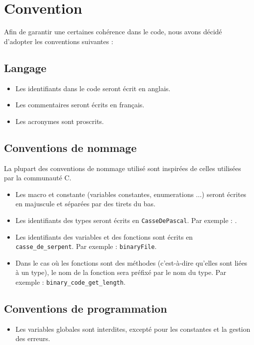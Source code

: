 \section{Convention}

Afin de garantir une certaines cohérence dans le code, nous avons décidé d'adopter les conventions suivantes :

\subsection{Langage}

\begin{itemize}
    \item Les identifiants dans le code seront écrit en anglais.
    \item Les commentaires seront écrits en français.
    \item Les acronymes sont proscrits.
\end{itemize}


\subsection{Conventions de nommage}

La plupart des conventions de nommage utilisé sont inspirées de celles utilisées par la communauté C.

\begin{itemize}
    \item Les macro et constante (variables constantes, enumerations ...) seront écrites en majuscule et séparées par des tirets du bas.
    \item Les identifiants des types seront écrits en \texttt{CasseDePascal}. Par exemple : \binaryCode.
    \item Les identifiants des variables et des fonctions sont écrits en \texttt{casse\_de\_serpent}. Par exemple : \texttt{binaryFile}.
    \item Dans le cas où les fonctions sont des méthodes (c'est-à-dire qu'elles sont liées à un type), le nom de la fonction sera préfixé par le nom du type. Par exemple : \texttt{binary\_code\_get\_length}.
\end{itemize}

\subsection{Conventions de programmation}

\begin{itemize}
    \item Les variables globales sont interdites, excepté pour les constantes et la gestion des erreurs.
\end{itemize}
